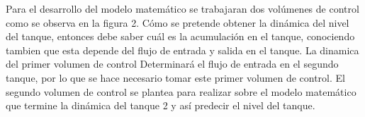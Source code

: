 \documentclass[a4paper,12pt,twoside]{proyectotanquesecci}
\begin{document}

Para el desarrollo del modelo matemático se trabajaran dos volúmenes de control como se observa en la figura 2. Cómo se pretende obtener la dinámica del nivel del tanque, entonces debe saber cuál es la acumulación en el tanque, conociendo tambien que esta depende del flujo de entrada y salida en el tanque. La dinamica del primer volumen de control Determinará el flujo de entrada en el segundo tanque, por lo que se hace necesario tomar este primer volumen de control. El segundo volumen de control se plantea para realizar sobre el modelo matemático que termine la dinámica del tanque 2 y así predecir el nivel del tanque.


















\end{document}
